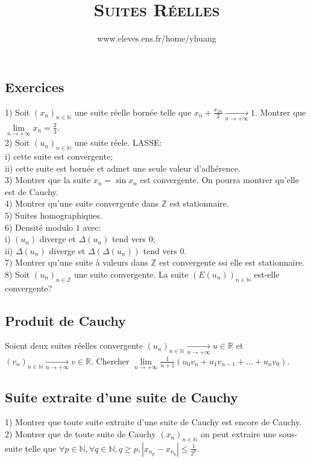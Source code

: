 \documentclass{article}
\begin{document}
\setcounter{section}{11}

\title{\textsc{Suites R\'eelles}}
\author{www.eleves.ens.fr/home/yhuang}
\date{}
\maketitle

\subsection{Exercices}
1) Soit $(x_n)_{n\in\mathbb{N}}$ une suite r\'eelle born\'ee telle que $x_n+\frac{x_{2n}}{2}\underset{n\to+\infty}{\longrightarrow}1$. Montrer que $\lim\limits_{n\to+\infty}x_n=\frac{2}{3}$.\\
2) Soit $(u_n)_{n\in\mathbb{N}}$ une suite r\'eele. LASSE:\\
i) cette suite est convergente;\\
ii) cette suite est born\'ee et admet une seule valeur d'adh\'erence.\\
3) Montrer que la suite $x_n=\sin x_n$ est convergente. On pourra montrer qu'elle est de Cauchy.\\
4) Montrer qu'une suite convergente dans $\mathbb{Z}$ est stationnaire.\\
5) Suites homographiques.\\
6) Densit\'e modulo $1$ avec:\\
i) $(u_n)$ diverge et $\Delta(u_n)$ tend vers $0$;\\
ii) $\Delta(u_n)$ diverge et $\Delta(\Delta(u_n))$ tend vers $0$.\\
7) Montrer qu'une suite \`a valeurs dans $\mathbb{Z}$ est convergente ssi elle est stationnaire.\\
8) Soit $(u_n)_{n\in\mathbb{Z}}$ une suite convergente. La suite $(E(u_n))_{n\in\mathbb{N}}$ est-elle convergente?

\subsection{Produit de Cauchy}
Soient deux suites r\'eelles convergente $(u_n)_{n\in\mathbb{N}}\underset{n\to+\infty}{\longrightarrow} u\in\mathbb{R}$ et $(v_n)_{n\in\mathbb{N}}\underset{n\to+\infty}{\longrightarrow} v\in\mathbb{R}$. Chercher $\lim\limits_{n\to+\infty}\frac{1}{n+1}(u_0v_n+u_1v_{n-1}+\dots+u_nv_0)$.

\subsection{Suite extraite d'une suite de Cauchy}
1) Montrer que toute suite extraite d'une suite de Cauchy est encore de Cauchy.\\
2) Montrer que de toute suite de Cauchy $(x_n)_{n\in\mathbb{N}}$ on peut extraire une sous-suite telle que $\forall p\in\mathbb{N}, \forall q\in\mathbb{N}, q\geq p, |x_{n_p}-x_{n_q}|\leq\frac{1}{2^p}$.
\end{document}
